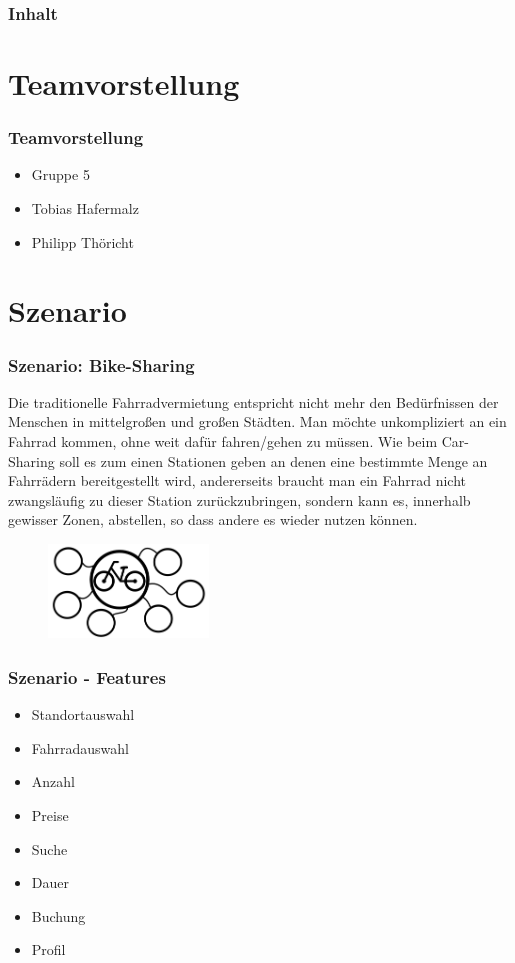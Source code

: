 \begin{frame}
	\frametitle*{Inhalt}
	\tableofcontents
\end{frame}

\section{Teamvorstellung}
\begin{frame}
	\frametitle*{Teamvorstellung}
	\begin{itemize}
		\item Gruppe 5
		\item Tobias Hafermalz
		\item Philipp Thöricht
	\end{itemize}
\end{frame}

\section{Szenario}
\begin{frame}
	\frametitle*{Szenario: Bike-Sharing} 
	Die traditionelle Fahrradvermietung entspricht nicht mehr den Bedürfnissen der Menschen in mittelgroßen und großen Städten.
	Man möchte unkompliziert an ein Fahrrad kommen, ohne weit dafür fahren/gehen zu müssen.
	Wie beim Car-Sharing soll es zum einen Stationen geben an denen eine bestimmte Menge an Fahrrädern bereitgestellt wird, andererseits braucht man ein Fahrrad nicht zwangsläufig zu dieser Station zurückzubringen, sondern kann es, innerhalb gewisser Zonen, abstellen, so dass andere es wieder nutzen können.
	\begin{figure}
		\centering
		\includegraphics[height=25mm]{pics/bike-sharing.png}
	\end{figure}
\end{frame}

\begin{frame}
	\frametitle*{Szenario - Features}
	\begin{itemize}
		\item Standortauswahl
		\item Fahrradauswahl 
		\item Anzahl
		\item Preise
		\item Suche
		\item Dauer
		\item Buchung
		\item Profil
	\end{itemize}
\end{frame}

